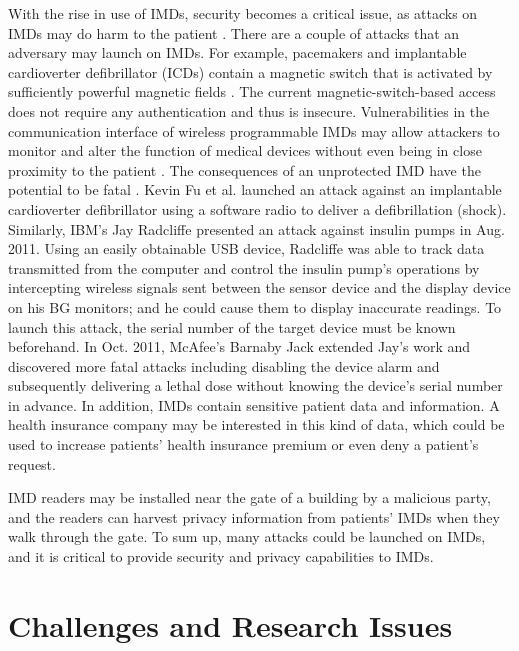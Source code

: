 With the rise in use of IMDs, security becomes a critical issue, as attacks on IMDs
may do harm to the patient \cite{Safety}. There are a couple of
attacks that an adversary may launch on IMDs.
For example, pacemakers and implantable cardioverter defibrillator
(ICDs) contain a magnetic switch that is activated by sufficiently
powerful magnetic fields \cite{mag}. The current
magnetic-switch-based access does not require any authentication and
thus is insecure. Vulnerabilities in the communication interface of
wireless programmable IMDs may allow attackers to monitor and alter
the function of medical devices without even being in close proximity
to the patient \cite{Inside}. The consequences of an unprotected IMD
have the potential to be fatal \cite{Panescu}. Kevin Fu et al. launched
an attack against an implantable cardioverter defibrillator using a
software radio to deliver a defibrillation (shock). Similarly, IBM's
Jay Radcliffe presented an attack against insulin pumps in Aug.
2011. Using an easily obtainable USB device, Radcliffe \cite{Radcliffe}
was able to track data transmitted from the computer and control the
insulin pump's operations by intercepting wireless signals sent
between the sensor device and the display device on his BG monitors;
and he could cause them to display inaccurate readings. To launch
this attack, the serial number of the target device must be known
beforehand. In Oct. 2011, McAfee's Barnaby Jack extended Jay's work
and discovered more fatal attacks including disabling the device
alarm and subsequently delivering a lethal dose without knowing the
device's serial number in advance. In addition, IMDs contain sensitive
patient data and information. A health insurance company may be interested
in this kind of data, which could be used to increase patients' health
insurance premium or even deny a patient's request.

IMD readers may be installed near the gate of a building by a malicious party, and the readers can harvest privacy
information from patients' IMDs when they walk through the gate. To
sum up, many attacks could be launched on IMDs, and it is critical to provide security and privacy
capabilities to IMDs.

\section{Challenges and Research Issues}
\label{subsec:3}


